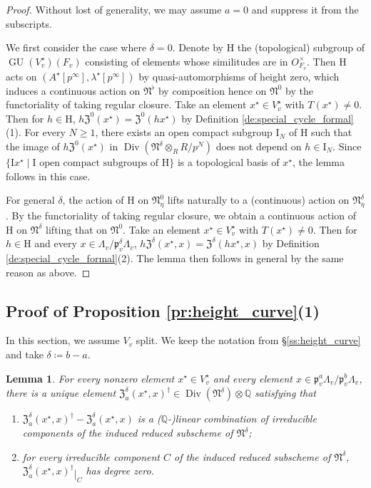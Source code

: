 \documentclass[12pt]{amsart}
\numberwithin{equation}{section}
\theoremstyle{plain}
\newtheorem{lem}[proposition]{Lemma}
\theoremstyle{definition}
\theoremstyle{remark}
\renewcommand{\d}[1]{\mathbb{#1}}
\newcommand{\f}[1]{\mathfrak{#1}}
\renewcommand{\r}[1]{\mathrm{#1}}
\renewcommand{\(}{\left(}
\renewcommand{\)}{\right)}
\newcommand{\res}{\mathbin{|}}
\renewcommand{\geq}{\geqslant}
\newcommand{\dQ}{\d Q}
\newcommand{\fN}{\f N}
\newcommand{\fZ}{\f Z}
\newcommand{\fp}{\f p}
\newcommand{\rH}{\r H}
\newcommand{\rI}{\r I}
\DeclareMathOperator{\Div}{Div}
\DeclareMathOperator{\GU}{GU}
\begin{document}
\begin{proof}
Without lost of generality, we may assume $a=0$ and suppress it from the subscripts.

We first consider the case where $\delta=0$. Denote by $\rH$ the (topological) subgroup of $\GU(V^\star_v)(F_v)$ consisting of elements whose similitudes are in $O_{F_v}^\times$. Then $\rH$ acts on $(A^\star[p^\infty],\lambda^\star[p^\infty])$ by quasi-automorphisms of height zero, which induces a continuous action on $\fN^\flat$ by composition hence on $\fN^0$ by the functoriality of taking regular closure. Take an element $x^\star\in V^\star_v$ with $T(x^\star)\neq 0$. Then for $h\in\rH$, $h\fZ^0(x^\star)=\fZ^0(h x^\star)$ by Definition \ref{de:special_cycle_formal}(1). For every $N\geq 1$, there exists an open compact subgroup $\rI_N$ of $\rH$ such that the image of $h\fZ^0(x^\star)$ in $\Div(\fN^\delta\otimes_RR/p^N)$ does not depend on $h\in\rI_N$. Since $\{\rI x^\star\res \rI\text{ open compact subgroups of }\rH\}$ is a topological basis of $x^\star$, the lemma follows in this case.

For general $\delta$, the action of $\rH$ on $\fN^0_\eta$ lifts naturally to a (continuous) action on $\fN^\delta_\eta$. By the functoriality of taking regular closure, we obtain a continuous action of $\rH$ on $\fN^\delta$ lifting that on $\fN^0$. Take an element $x^\star\in V^\star_v$ with $T(x^\star)\neq 0$. Then for $h\in\rH$ and every $x\in\Lambda_v/\fp_v^\delta\Lambda_v$, $h\fZ^\delta(x^\star,x)=\fZ^\delta(h x^\star,x)$ by Definition \ref{de:special_cycle_formal}(2). The lemma then follows in general by the same reason as above.
\end{proof}



\subsection{Proof of Proposition \ref{pr:height_curve}(1)}
\label{ss:height_curve_split}

In this section, we assume $V_v$ split. We keep the notation from \S\ref{ss:height_curve} and take $\delta\coloneqq b-a$.

\begin{lem}\label{le:height_curve_split_1}
For every nonzero element $x^\star\in V^\star_v$ and every element $x\in\fp_v^a\Lambda_v/\fp_v^b\Lambda_v$, there is a unique element $\fZ_a^\delta(x^\star,x)^\dag\in\Div(\fN^\delta)\otimes\dQ$ satisfying that
\begin{enumerate}[label=(\alph*)]
  \item $\fZ_a^\delta(x^\star,x)^\dag-\fZ_a^\delta(x^\star,x)$ is a ($\dQ$-)linear combination of irreducible components of the induced reduced subscheme of $\fN^\delta$;

  \item for every irreducible component $C$ of the induced reduced subscheme of $\fN^\delta$, $\fZ_a^\delta(x^\star,x)^\dag\res_C$ has degree zero.
\end{enumerate}
\end{lem}
\end{document}
